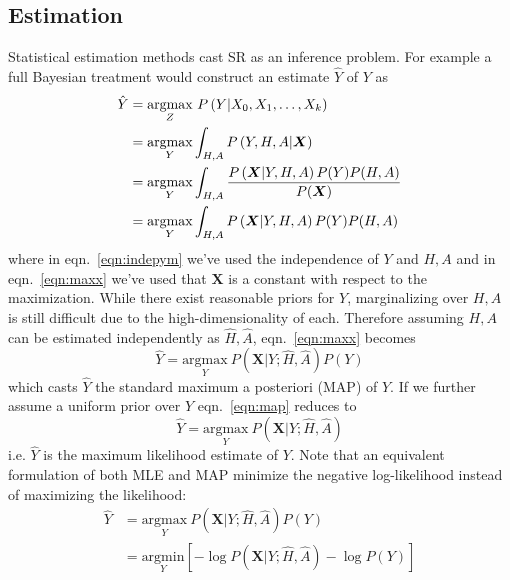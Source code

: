 \subsection{Estimation}
Statistical estimation methods cast SR as an inference problem.
%
For example a full Bayesian treatment would construct an estimate $\hat{Y}$ of $Y$ as
\begin{align}
    \hat{Y} &= \underset{Z}{\text{argmax}}~P\left( Y | X_0, X_1, \mathellipsis, X_k \right) \nonumber \\
    &= \underset{Y}{\text{argmax}} \int_{H, A} P\left( Y, H, A | \bm{X}\right) \nonumber \\
    &= \underset{Y}{\text{argmax}} \int_{H, A} \frac{P\left(\bm{X} | Y, H, A \right)P(Y) P(H, A)}{P(\bm{X})}\label{eqn:indepym} \\
    &= \underset{Y}{\text{argmax}} \int_{H, A} P\left(\bm{X} | Y, H, A \right)P(Y) P(H, A) \label{eqn:maxx}
\end{align}
where in eqn.~\ref{eqn:indepym} we've used the independence of $Y$ and $H,A$\cite{Hardie1997} and in eqn.~\ref{eqn:maxx} we've used that $\bm{X}$ is a constant with respect to the maximization.
%
While there exist reasonable priors for $Y$, marginalizing over $H, A$ is still difficult due to the high-dimensionality of each.
%
Therefore assuming $H, A$ can be estimated independently as $\hat{H}, \hat{A}$, eqn.~\ref{eqn:maxx} becomes
\begin{equation}
    \hat{Y} = \underset{Y}{\text{argmax}}~P\left(\bm{X} | Y; \hat{H}, \hat{A} \right) P(Y)
    \label{eqn:map}
\end{equation}
which casts $\hat{Y}$ the standard maximum a posteriori (MAP) of $Y$.
%
If we further assume a uniform prior over $Y$ eqn.~\ref{eqn:map} reduces to
\begin{equation}
    \hat{Y} = \underset{Y}{\text{argmax}}~P\left(\bm{X} | Y; \hat{H}, \hat{A}\right)
    \label{eqn:mle}
\end{equation}
i.e. $\hat{Y}$ is the maximum likelihood estimate of $Y$.
%
Note that an equivalent formulation of both MLE and MAP minimize the negative log-likelihood instead of maximizing the likelihood:
\begin{align}
    \hat{Y} &= \underset{Y}{\text{argmax}}~P\left(\bm{X} | Y; \hat{H}, \hat{A}\right) P(Y) \nonumber \\
    &=  \underset{Y}{\text{argmin}}\left[ -\log{P\left(\bm{X} | Y; \hat{H}, \hat{A} \right)} -\log{P(Y)} \right]
    \label{eqn:logmap}
\end{align}
%
